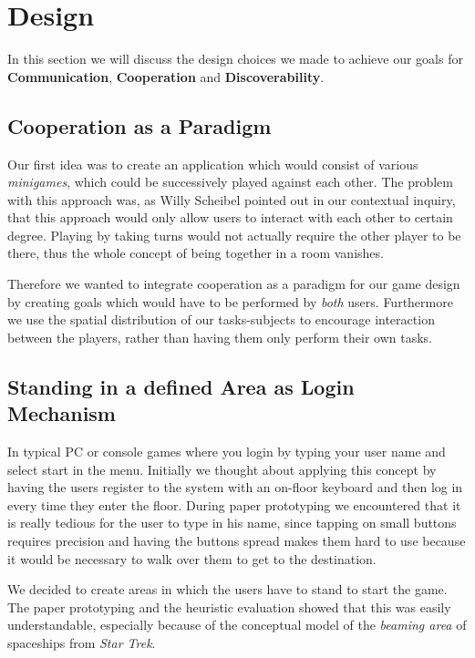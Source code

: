 \documentclass{sigchi}
\begin{document}
\section{Design}
\vspace{1mm}
In this section we will discuss the design choices we made to achieve our goals for \textbf{Communication}, \textbf{Cooperation} and \textbf{Discoverability}.

\subsection{Cooperation as a Paradigm}
\vspace{1mm}
Our first idea was to create an application which would consist of various \textit{minigames}, which could be successively played against each other. The problem with this approach was, as Willy Scheibel pointed out in our contextual inquiry, that this approach would only allow users to interact with each other to certain degree. Playing by taking turns would not actually require the other player to be there, thus the whole concept of being together in a room vanishes. 

Therefore we wanted to integrate cooperation as a paradigm for our game design by creating goals which would have to be performed by \textit{both} users. Furthermore we use the spatial distribution of our tasks-subjects to encourage interaction between the players, rather than having them only perform their own tasks. 
 
\subsection{Standing in a defined Area as Login Mechanism}
\vspace{1mm}
In typical PC or console games where you login by typing your user name and select start in the menu. Initially we thought about applying this concept by having the users register to the system with an on-floor keyboard and then log in every time they enter the floor. During paper prototyping we encountered that it is really tedious for the user to type in his name, since tapping on small buttons requires precision and having the buttons spread makes them hard to use because it would be necessary to walk over them to get to the destination. 

We decided to create areas in which the users have to stand to start the game. The paper prototyping and the heuristic evaluation showed that this was easily understandable, especially because of the conceptual model of the \textit{beaming area} of spaceships from \textit{Star Trek}. 
\end{document}
